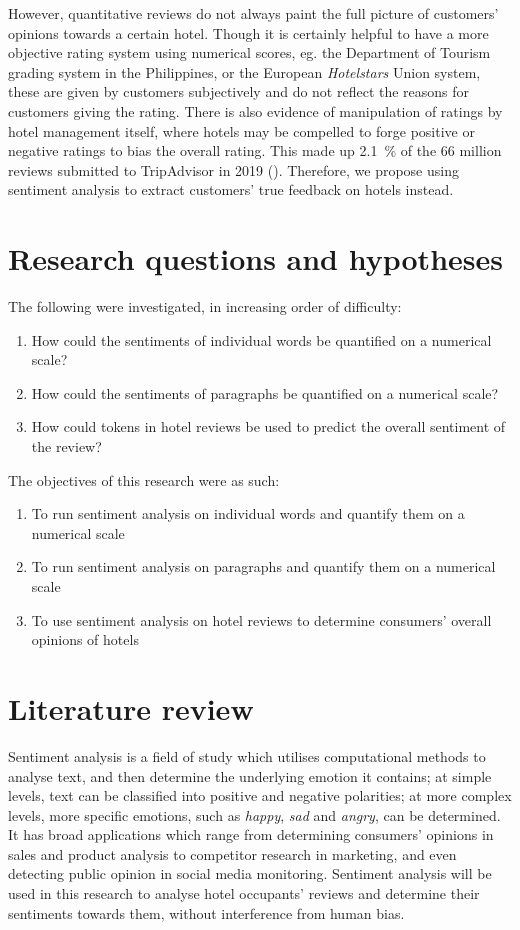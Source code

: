 \documentclass[11pt, a4paper]{pancake-article}
\begin{document}
However, quantitative reviews do not always paint the full picture of customers'
opinions towards a certain hotel. Though it is certainly helpful to have a more
objective rating system using numerical scores, eg. the Department of Tourism
grading system in the Philippines, or the European
\textit{Hotelstars} Union system,
these are given by customers subjectively and do not reflect the reasons for
customers giving the rating. There is also evidence of manipulation of ratings
by hotel management itself, where hotels may be compelled to forge positive or
negative ratings to bias the overall rating. This made up \qty{2.1}{\percent}
of the 66 million reviews submitted to TripAdvisor in 2019 (\cite{tripadvisor}).
Therefore, we propose using sentiment analysis to extract customers' true
feedback on hotels instead.

\section{Research questions and hypotheses}
The following were investigated, in increasing order of difficulty:
\begin{enumerate}
  \item How could the sentiments of individual words be quantified on
    a numerical scale?
  \item How could the sentiments of paragraphs be quantified on a
    numerical scale?
  \item How could tokens in hotel reviews be used to predict the
    overall sentiment of the review?
\end{enumerate}

The objectives of this research were as such:
\begin{enumerate}
  \item To run sentiment analysis on individual words and quantify
    them on a numerical scale
  \item To run sentiment analysis on paragraphs and quantify them on
    a numerical scale
  \item To use sentiment analysis on hotel reviews to determine
    consumers' overall opinions of hotels
\end{enumerate}

\section{Literature review}
Sentiment analysis is a field of study which utilises computational
methods to analyse text,
and then determine the underlying emotion it contains; at simple
levels, text can be classified
into positive and negative polarities; at more complex levels, more
specific emotions, such as
\textit{happy}, \textit{sad} and \textit{angry}, can be determined. It
has broad applications which range from determining consumers'
opinions in sales and product
analysis to competitor research in marketing, and even detecting
public opinion in social media
monitoring. Sentiment analysis will be used in this research to
analyse hotel occupants' reviews
and determine their sentiments towards them, without interference
from human bias.
\end{document}
